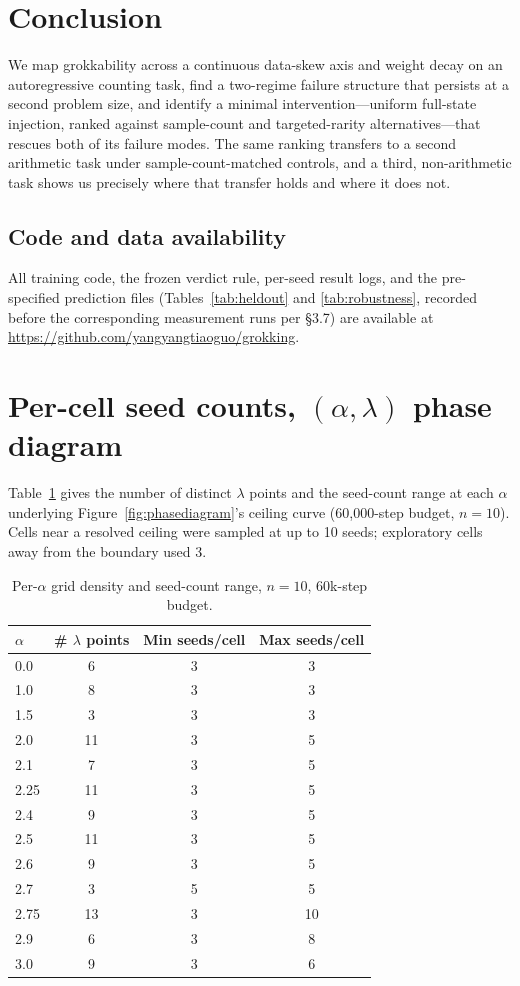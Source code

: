 \documentclass[11pt]{article}
\begin{document}
\section{Conclusion}

We map grokkability across a continuous data-skew axis and weight decay on an autoregressive counting task, find a two-regime failure structure that persists at a second problem size, and identify a minimal intervention---uniform full-state injection, ranked against sample-count and targeted-rarity alternatives---that rescues both of its failure modes. The same ranking transfers to a second arithmetic task under sample-count-matched controls, and a third, non-arithmetic task shows us precisely where that transfer holds and where it does not.

\subsection*{Code and data availability}
All training code, the frozen verdict rule, per-seed result logs, and the pre-specified prediction files (Tables~\ref{tab:heldout} and \ref{tab:robustness}, recorded before the corresponding measurement runs per \S3.7) are available at \url{https://github.com/yangyangtiaoguo/grokking}.




\appendix

\section{Per-cell seed counts, $(\alpha,\lambda)$ phase diagram}
\label{app:seedcounts}
Table~\ref{tab:appendixseeds} gives the number of distinct $\lambda$ points and the seed-count range at each $\alpha$ underlying Figure~\ref{fig:phasediagram}'s ceiling curve (60{,}000-step budget, $n=10$). Cells near a resolved ceiling were sampled at up to 10 seeds; exploratory cells away from the boundary used 3.

\begin{table}[h]
\centering
\small
\caption{Per-$\alpha$ grid density and seed-count range, $n=10$, 60k-step budget.}
\label{tab:appendixseeds}
\begin{tabular}{lccc}
\toprule
$\alpha$ & \# $\lambda$ points & Min seeds/cell & Max seeds/cell \\
\midrule
0.0 & 6 & 3 & 3 \\
1.0 & 8 & 3 & 3 \\
1.5 & 3 & 3 & 3 \\
2.0 & 11 & 3 & 5 \\
2.1 & 7 & 3 & 5 \\
2.25 & 11 & 3 & 5 \\
2.4 & 9 & 3 & 5 \\
2.5 & 11 & 3 & 5 \\
2.6 & 9 & 3 & 5 \\
2.7 & 3 & 5 & 5 \\
2.75 & 13 & 3 & 10 \\
2.9 & 6 & 3 & 8 \\
3.0 & 9 & 3 & 6 \\
\bottomrule
\end{tabular}
\end{table}
\end{document}
